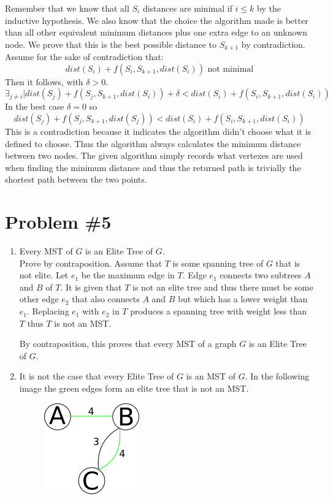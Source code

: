 \documentclass{article}
\begin{document}
Remember that we know that all $S_i$ distances are minimal if $i\le k$ by the inductive hypothesis. We also know that the choice the algorithm made is better than all other equivalent minimum distances plus one extra edge to an unknown node. We prove that this is the best possible distance to $S_{k+1}$ by contradiction.\\

Assume for the sake of contradiction that:
$$dist(S_i) + f(S_i, S_{k+1}, dist(S_i))\text{ not minimal}$$
Then it follows, with $\delta > 0$. 
$$\exists_{j\not= i}|dist(S_j) + f(S_j, S_{k+1}, dist(S_i)) + \delta < dist(S_i) + f(S_i, S_{k+1}, dist(S_i))$$
In the best case $\delta = 0$ so 
        $$dist(S_j) + f(S_j, S_{k+1}, dist(S_j)) < dist(S_i) + f(S_i, S_{k+1}, dist(S_i))$$
This is a contradiction because it indicates the algorithm didn't choose what it is defined to choose. Thus the algorithm always calculates the minimum distance between two nodes. The given algorithm simply records what vertexes are used when finding the minimum distance and thus the returned path is trivially the shortest path between the two points.

\section*{Problem \#5}
\begin{enumerate}
    \item Every MST of $G$ is an Elite Tree of $G$.\\
        Prove by contraposition. Assume that $T$ is some spanning tree of $G$ that is not elite. Let $e_1$ be the maximum edge in $T$. Edge $e_1$ connects two subtrees $A$ and $B$ of $T$. It is given that $T$ is not an elite tree and thus there must be some other edge $e_2$ that also connects $A$ and $B$ but which has a lower weight than $e_1$. Replacing $e_1$ with $e_2$ in $T$ produces a spanning tree with weight less than $T$ thus $T$ is not an MST.

        By contraposition, this proves that every MST of a graph $G$ is an Elite Tree of $G$.

    \item It is not the case that every Elite Tree of $G$ is an MST of $G$. In the following image the green edges form an elite tree that is not an MST.
    \begin{figure}[hb]
        \centering
        \includegraphics[scale=0.5]{eliteNotMST}
    \end{figure}
\end{enumerate}
\end{document}
